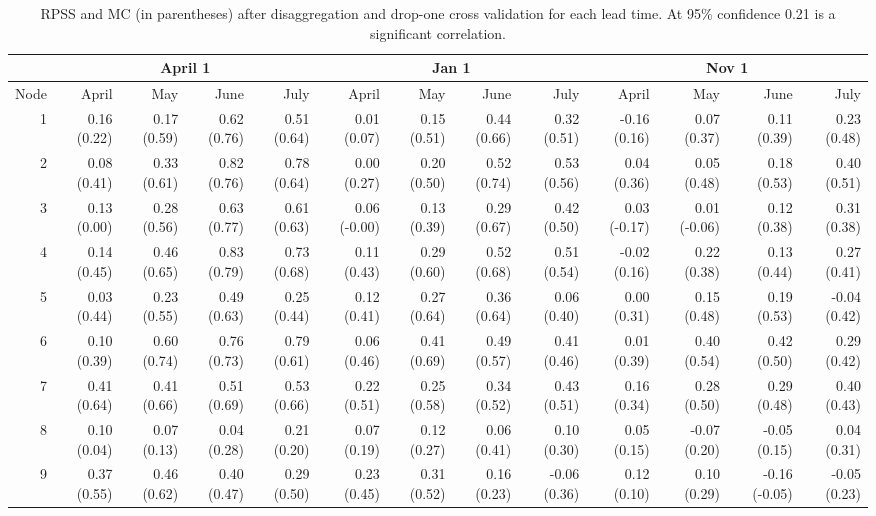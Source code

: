 \begin{sidewaystable}[ht]
\begin{center}\footnotesize
\caption{RPSS and MC (in parentheses) after disaggregation and drop-one cross validation for each lead time. At 95\% confidence 0.21 is a significant correlation. }\label{tab:dropone}
\begin{tabular}{rrrrr|rrrr|rrrr}
  \toprule
  &\multicolumn{4}{c}{April 1} & \multicolumn{4}{c}{Jan 1} & \multicolumn{4}{c}{Nov 1}\\
  \midrule
Node & April & May & June & July & April & May & June & July & April & May & June & July \\ 
  \midrule
1 & 0.16 (0.22) & 0.17 (0.59) & 0.62 (0.76) & 0.51 (0.64) & 0.01 (0.07) & 0.15 (0.51) & 0.44 (0.66) & 0.32 (0.51) & -0.16 (0.16) & 0.07 (0.37) & 0.11 (0.39) & 0.23 (0.48)  \\
  2 & 0.08 (0.41) & 0.33 (0.61) & 0.82 (0.76) & 0.78 (0.64) & 0.00 (0.27) & 0.20 (0.50) & 0.52 (0.74) & 0.53 (0.56) & 0.04 (0.36) & 0.05 (0.48) & 0.18 (0.53) & 0.40 (0.51)  \\
  3 & 0.13 (0.00) & 0.28 (0.56) & 0.63 (0.77) & 0.61 (0.63) & 0.06 (-0.00) & 0.13 (0.39) & 0.29 (0.67) & 0.42 (0.50) & 0.03 (-0.17) & 0.01 (-0.06) & 0.12 (0.38) & 0.31 (0.38)  \\
  4 & 0.14 (0.45) & 0.46 (0.65) & 0.83 (0.79) & 0.73 (0.68) & 0.11 (0.43) & 0.29 (0.60) & 0.52 (0.68) & 0.51 (0.54) & -0.02 (0.16) & 0.22 (0.38) & 0.13 (0.44) & 0.27 (0.41)  \\
  5 & 0.03 (0.44) & 0.23 (0.55) & 0.49 (0.63) & 0.25 (0.44) & 0.12 (0.41) & 0.27 (0.64) & 0.36 (0.64) & 0.06 (0.40) & 0.00 (0.31) & 0.15 (0.48) & 0.19 (0.53) & -0.04 (0.42)  \\
  6 & 0.10 (0.39) & 0.60 (0.74) & 0.76 (0.73) & 0.79 (0.61) & 0.06 (0.46) & 0.41 (0.69) & 0.49 (0.57) & 0.41 (0.46) & 0.01 (0.39) & 0.40 (0.54) & 0.42 (0.50) & 0.29 (0.42)  \\
  7 & 0.41 (0.64) & 0.41 (0.66) & 0.51 (0.69) & 0.53 (0.66) & 0.22 (0.51) & 0.25 (0.58) & 0.34 (0.52) & 0.43 (0.51) & 0.16 (0.34) & 0.28 (0.50) & 0.29 (0.48) & 0.40 (0.43)  \\
  8 & 0.10 (0.04) & 0.07 (0.13) & 0.04 (0.28) & 0.21 (0.20) & 0.07 (0.19) & 0.12 (0.27) & 0.06 (0.41) & 0.10 (0.30) & 0.05 (0.15) & -0.07 (0.20) & -0.05 (0.15) & 0.04 (0.31)  \\
  9 & 0.37 (0.55) & 0.46 (0.62) & 0.40 (0.47) & 0.29 (0.50) & 0.23 (0.45) & 0.31 (0.52) & 0.16 (0.23) & -0.06 (0.36) & 0.12 (0.10) & 0.10 (0.29) & -0.16 (-0.05) & -0.05 (0.23)  \\

\end{tabular}
\end{center}
\end{sidewaystable}
